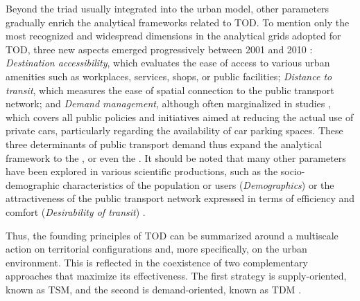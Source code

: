 \begin{refsegment}
Beyond the triad usually integrated into the urban model, other parameters gradually enrich the analytical frameworks related to \acrshort{TOD}. To mention only the most recognized and widespread dimensions in the analytical grids adopted for \acrshort{TOD}, three new aspects emerged progressively between 2001 and 2010 \textcolor{blue}{\autocite[267]{ewing_travel_2010}}: \textsl{Destination accessibility}, which evaluates the ease of access to various urban amenities such as workplaces, services, shops, or public facilities; \textsl{Distance to transit}, which measures the ease of spatial connection to the public transport network; and \textsl{Demand management}, although often marginalized in studies \textcolor{blue}{\autocite[267]{ewing_travel_2010}}, which covers all public policies and initiatives aimed at reducing the actual use of private cars, particularly regarding the availability of car parking spaces. These three determinants of public transport demand thus expand the analytical framework to the , or even the  \textcolor{blue}{\autocite[4-6]{thomas_transit-oriented_2020}}. It should be noted that many other parameters have been explored in various scientific productions, such as the socio-demographic characteristics of the population or users (\textsl{Demographics}) \textcolor{blue}{\autocite[75]{ewing_trip_2017}} or the attractiveness of the public transport network expressed in terms of efficiency and comfort (\textsl{Desirability of transit}) \textcolor{blue}{\autocite[8]{mangu_evaluation_2025}}.%

Thus, the founding principles of \acrshort{TOD} can be summarized around a multiscale action on territorial configurations and, more specifically, on the urban environment. This is reflected in the coexistence of two complementary approaches that maximize its effectiveness. The first strategy is supply-oriented, known as \acrfull{TSM}, and the second is demand-oriented, known as \acrfull{TDM} \textcolor{blue}{\autocite[67]{cervero_transit_1998}}.


\end{refsegment}
